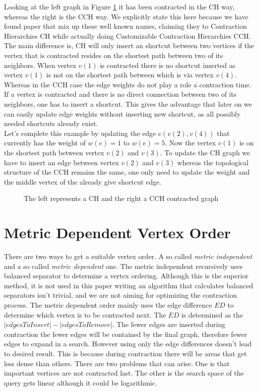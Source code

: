 Looking at the left graph in Figure \ref*{fig:DifferenceCHAndCCH} it has been contracted in the CH way, whereas the right is the CCH way. We explicitly state this here because 
we have found paper \cite{Ouyang_2020} that mix up these well known names, claiming they to Contraction Hierarchies CH while actually doing Customizable Contraction Hierarchies CCH. 
The main difference is, CH will only insert an shortcut between two vertices if the vertex that is contracted resides on the shortest path between two of its neighbors. 
When vertex $v(1)$ is contracted there is no shortcut inserted as vertex $v(1)$ is not on the shortest path between which is via vertex $v(4)$.
\\
Whereas in the CCH case the edge weights do not play a role a contraction time. If a vertex is contracted and there is no direct connection between two of its neighbors, one has to insert a shortcut. This gives
the advantage that later on we can easily update edge weights without inserting new shortcut, as all possibly needed shortcuts already exist.
\\ 
Let's complete this example by updating the edge $e(v(2), v(4))$ that currently has the weight of $w(e)=1$ to $w(e) = 5$. Now the vertex $v(1)$ is on the shortest path between vertex $v(2)$ and $v(3)$. 
To update the CH graph we have to insert an edge between vertex $v(2)$ and $v(3)$ whereas the topological structure of the CCH remains the same, one only need to update the weight and the middle vertex of the already give shortcut edge.

\begin{figure}
    \centering
    
    \caption{The left represents a CH and the right a CCH contracted graph}
    \label{fig:DifferenceCHAndCCH}
\end{figure}

\section{Metric Dependent Vertex Order}\label{sec:metric_dependent_vertex_order}
There are two ways to get a suitable vertex order. A so called \textit{metric independent} and a so called \textit{metric dependent} one. The metric independent recursively uses balanced separator to determine a vertex ordering\cite{CCH}. Although this is the superior method, it is not used in this paper writing an algorithm that calculates balanced separators isn't trivial, and we are not aiming for optimizing the contraction process. 
The metric dependent order mainly uses the edge difference $ED$ to determine which vertex is to be contracted next. The $ED$ is determined as the $|edges To Insert| - |edges To Remove|$. The fewer edges are inserted during contraction the fewer edges will be contained by the final graph, therefore fewer edges to expand in a search. However using only the edge differences doesn't lead to desired result. This is because during contraction there will be areas that get less dense than others. 
There are two problems that can arise. One is that important vertices are not contracted last. The other is the search space of the query gets linear although it could be logarithmic.

